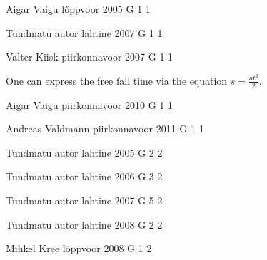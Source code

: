 \documentclass[11pt]{article}
\begin{document}
{Aigar Vaigu} %
{lõppvoor} %
{2005} %
{G 1} %
{1} %
{

\ifEngHint
\fi
}

{Tundmatu autor} %
{lahtine} %
{2007} %
{G 1} %
{1} %
{

\ifEngHint
\fi
}

{Valter Kiisk} %
{piirkonnavoor} %
{2007} %
{G 1} %
{1} %
{

\ifEngHint
One can express the free fall time via the equation $s = \frac{at^2}{2}$.
\fi
}

{Aigar Vaigu} %
{piirkonnavoor} %
{2010} %
{G 1} %
{1} %
{

\ifEngHint
\fi
}

{Andreas Valdmann} %
{piirkonnavoor} %
{2011} %
{G 1} %
{1} %
{

\ifEngHint
\fi
}

{Tundmatu autor} %
{lahtine} %
{2005} %
{G 2} %
{2} %
{

\ifEngHint
\fi
}

{Tundmatu autor} %
{lahtine} %
{2006} %
{G 3} %
{2} %
{

\ifEngHint
\fi
}

{Tundmatu autor} %
{lahtine} %
{2007} %
{G 5} %
{2} %
{

\ifEngHint
\fi
}

{Tundmatu autor} %
{lahtine} %
{2008} %
{G 2} %
{2} %
{

\ifEngHint
\fi
}

{Mihkel Kree} %
{lõppvoor} %
{2008} %
{G 1} %
{2} %
{

\ifEngHint
\fi
}
\end{document}
